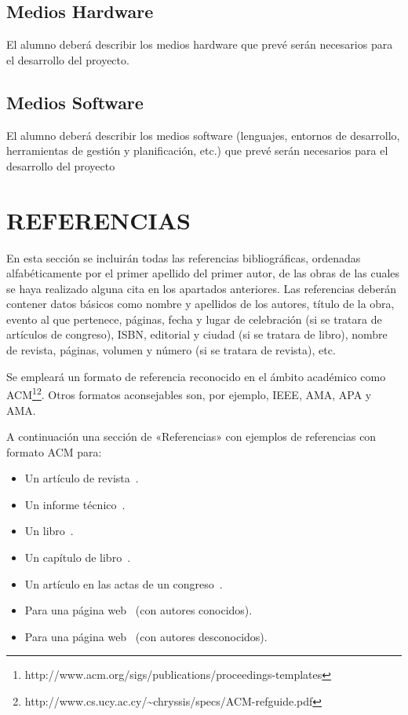 \documentclass{pre-tfg}
\begin{document}
\subsection{Medios Hardware}

El alumno deberá describir los medios hardware que prevé serán necesarios para el
desarrollo del proyecto.


\subsection{Medios Software}

El alumno deberá describir los medios software (lenguajes, entornos de desarrollo,
herramientas de gestión y planificación, etc.) que prevé serán necesarios para el
desarrollo del proyecto


\section{REFERENCIAS}

En esta sección se incluirán todas las referencias bibliográficas, ordenadas
alfabéticamente por el primer apellido del primer autor, de las obras de las cuales se
haya realizado alguna cita en los apartados anteriores. Las referencias deberán contener
datos básicos como nombre y apellidos de los autores, título de la obra, evento al que
pertenece, páginas, fecha y lugar de celebración (si se tratara de artículos de congreso),
ISBN, editorial y ciudad (si se tratara de libro), nombre de revista, páginas, volumen y
número (si se tratara de revista), etc.

Se empleará un formato de referencia reconocido en el ámbito académico como
ACM\footnote{http://www.acm.org/sigs/publications/proceedings-templates}\footnote{http://www.cs.ucy.ac.cy/\~{}chryssis/specs/ACM-refguide.pdf}.
Otros formatos aconsejables son, por ejemplo, IEEE, AMA, APA y AMA.

A continuación una sección de «Referencias» con ejemplos de referencias con formato ACM para:

\begin{itemize}
\item Un artículo de revista~\cite{Bow93}.
\item Un informe técnico~\cite{Ding97}.
\item Un libro~\cite{Tavel07}.
\item Un capítulo de libro~\cite{Greiner99}.
\item Un artículo en las actas de un congreso~\cite{Frohlic00}.
\item Para una página web~\cite{Steele04} (con autores conocidos).
\item Para una página web~\cite{Oxygen} (con autores desconocidos).
\end{itemize}



\singlespacing

\end{document}
